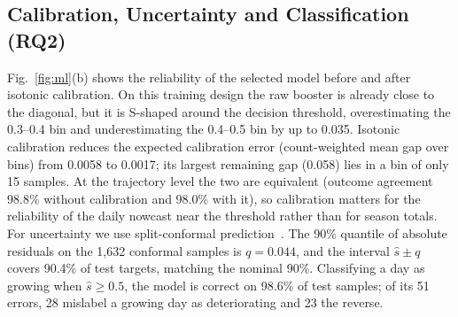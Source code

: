 \documentclass[conference]{IEEEtran}
\begin{document}
\subsection{Calibration, Uncertainty and Classification (RQ2)}
Fig.~\ref{fig:ml}(b) shows the reliability of the selected model before and after isotonic
calibration. On this training design the raw booster is already close to the diagonal, but it is
S-shaped around the decision threshold, overestimating the 0.3--0.4 bin and underestimating the
0.4--0.5 bin by up to 0.035. Isotonic calibration reduces the expected calibration error
(count-weighted mean gap over bins) from 0.0058 to 0.0017; its largest remaining gap
(0.058) lies in a bin of only 15 samples. At the trajectory level the two are
equivalent (outcome agreement 98.8\% without calibration and 98.0\% with it), so
calibration matters for the reliability of the daily nowcast near the threshold rather than for
season totals. For uncertainty we use split-conformal
prediction~\cite{angelopoulos2023conformal}. The 90\% quantile of absolute residuals on the
1{,}632 conformal samples is $q = 0.044$, and the interval $\hat s \pm q$ covers
90.4\% of test targets, matching the nominal 90\%. Classifying a day as growing when
$\hat s \ge 0.5$, the model is correct on 98.6\% of test samples; of its 51 errors,
28 mislabel a growing day as deteriorating and 23 the reverse.
\end{document}
